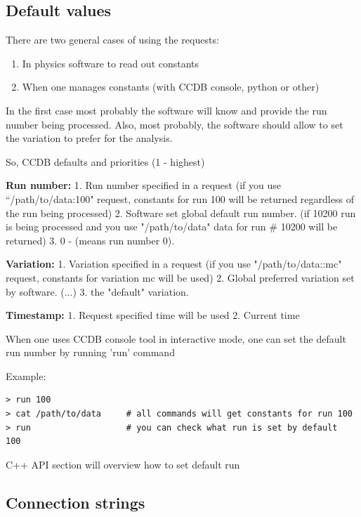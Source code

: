 \documentclass{article}
\begin{document}
\subsection{Default values}

There are two general cases of using the requests:
\begin{enumerate}
  \item In physics software to read out constants
  \item When one manages constants (with CCDB console, python or other)
\end{enumerate}
\vspace{1 em}

In the first case most probably the software will know and provide the run
number being processed. Also, most probably, the software should allow to set
the variation to prefer for the analysis.

So, CCDB defaults and priorities (1 - highest)

\textbf{Run number:}
1. Run number specified in a request
(if you use ``/path/to/data:100" request, constants for run 100 will be returned
regardless of the run being processed)
2. Software set global default run number.
(if 10200 run is being processed and you use "/path/to/data" data for run \#
 10200 will be returned)
3. 0 - (means run number 0).

\textbf{Variation:}
1. Variation specified in a request
(if you use "/path/to/data::mc" request, constants for variation mc will be used)
2. Global preferred variation set by software.
(...)
3. the "default" variation.


\textbf{Timestamp:}
1. Request specified time will be used
2. Current time

When one uses CCDB console tool in interactive mode, one can set the default run number by running 'run' command

Example:
\begin{verbatim}
> run 100
> cat /path/to/data     # all commands will get constants for run 100
> run                   # you can check what run is set by default
100
\end{verbatim}
C++ API section will overview how to set default run


\subsection{Connection strings}\label{sec:connection}
\end{document}
